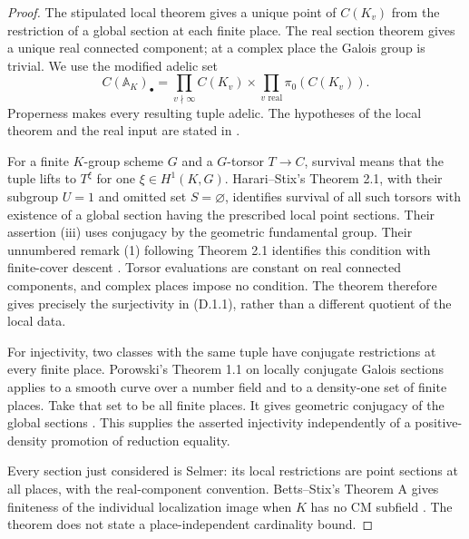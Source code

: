 \begin{proof}
The stipulated local theorem gives a unique point of $C(K_v)$
from the restriction of a global section at each finite place.
The real section theorem gives a unique real connected component;
at a complex place the Galois group is trivial. We use the
modified adelic set
\[
 C(\mathbb A_K)_\bullet=
 \prod_{v\nmid\infty}C(K_v)\times
 \prod_{v\text{ real}}\pi_0(C(K_v)).
\]
Properness makes every resulting tuple adelic. The hypotheses of
the local theorem and the real input are stated in
\cite[Theorem 1.1 and \S8]{AgentOpenAILocal}.

For a finite $K$-group scheme $G$ and a $G$-torsor $T\to C$,
survival means that the tuple lifts to $T^\xi$ for one
$\xi\in H^1(K,G)$. Harari--Stix's Theorem 2.1, with their
subgroup $U=1$ and omitted set $S=\varnothing$, identifies survival
of all such torsors with existence of a global section having the
prescribed local point sections. Their assertion (iii) uses
conjugacy by the geometric fundamental group. Their unnumbered remark (1) following Theorem 2.1
identifies this condition with finite-cover descent
\cite[preprint Theorem 2.1, (i)$\Leftrightarrow$(iii), and
unnumbered remark (1) following Theorem 2.1]{AgentHarariStix}. Torsor evaluations are constant
on real connected components, and complex places impose no
condition. The theorem therefore gives precisely the surjectivity
in (D.1.1), rather than a different quotient of the local data.

For injectivity, two classes with the same tuple have conjugate
restrictions at every finite place. Porowski's Theorem 1.1 on
locally conjugate Galois sections applies to a smooth curve over
a number field and to a density-one set of finite places. Take
that set to be all finite places. It gives geometric conjugacy of
the global sections \cite[Theorem 1.1]{AgentPorowskiConjugacy}.
This supplies the asserted injectivity independently of a
positive-density promotion of reduction equality.

Every section just considered is Selmer: its local restrictions
are point sections at all places, with the real-component
convention. Betts--Stix's Theorem A gives finiteness of the
individual localization image when $K$ has no CM subfield
\cite[Definition 1.1 and Theorem A]{AgentBettsStix}. The theorem
does not state a place-independent cardinality bound.
\end{proof}

